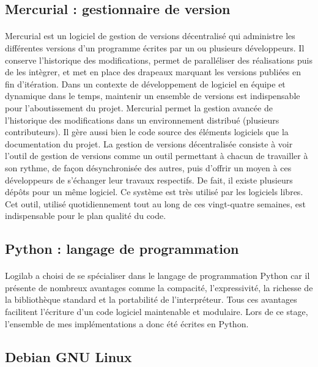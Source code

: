 \documentclass {report}
\begin{document}
\subsection{Mercurial : gestionnaire de version}
\paragraph{}
Mercurial est un logiciel de gestion de versions décentralisé qui administre les différentes versions d'un programme écrites par un ou plusieurs développeurs. Il conserve l’historique des modifications, permet de paralléliser des réalisations puis de les intègrer, et met en place des drapeaux marquant les versions publiées en fin d’itération. Dans un contexte de développement de logiciel en équipe et dynamique dans le temps, maintenir un ensemble de versions est indispensable pour l'aboutissement du projet. Mercurial permet la gestion avancée de l’historique des modifications dans un environnement distribué (plusieurs contributeurs). Il gère aussi bien le code source des éléments logiciels que la documentation du projet. La gestion de versions décentralisée consiste à voir l'outil de gestion de versions comme un outil permettant à chacun de travailler à son rythme, de façon désynchronisée des autres, puis d'offrir un moyen à ces développeurs de s'échanger leur travaux respectifs. De fait, il existe plusieurs dépôts pour un même logiciel. Ce système est très utilisé par les logiciels libres. Cet outil, utilisé quotidiennement tout au long de ces vingt-quatre semaines, est indispensable pour le plan qualité du code.


\subsection{Python : langage de programmation}
\paragraph{}
Logilab a choisi de se spécialiser dans le langage de programmation Python car il présente de nombreux avantages comme la compacité, l'expressivité, la richesse de la bibliothèque standard et la portabilité de l’interpréteur. Tous ces avantages facilitent l’écriture d'un code logiciel maintenable et modulaire. Lors de ce stage, l'ensemble de mes implémentations a donc été écrites en Python.
\subsection{Debian GNU Linux}
\end{document}

